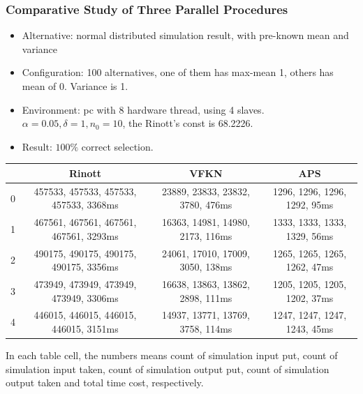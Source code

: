 \documentclass{beamer}
\begin{document}
\begin{frame}
\frametitle{Comparative Study of Three Parallel Procedures}
\begin{itemize}
\item {Alternative: } normal distributed simulation result, with pre-known mean and variance
\item {Configuration: } 100 alternatives, one of them has max-mean 1, others has mean of 0. Variance is 1.
\item {Environment: } pc with 8 hardware thread, using 4 slaves. $\alpha=0.05, \delta=1, n_0 = 10$, the Rinott's const is 68.2226.
\item {Result: } $100\%$ correct selection.
\end{itemize}
\begin{table}[ht]
\begin{center}
\scalebox{0.6}
{
\begin{tabular}{|c|c|c|c|}
\hline
& Rinott & VFKN & APS \\
\hline
0 & 457533, 457533, 457533, 457533, 3368ms & 23889, 23833, 23832, 3780, 476ms & 1296, 1296, 1296, 1292, 95ms \\
\hline
1 & 467561, 467561, 467561, 467561, 3293ms & 16363, 14981, 14980, 2173, 116ms & 1333, 1333, 1333, 1329, 56ms \\
\hline
2 & 490175, 490175, 490175, 490175, 3356ms & 24061, 17010, 17009, 3050, 138ms & 1265, 1265, 1265, 1262, 47ms \\
\hline
3 & 473949, 473949, 473949, 473949, 3306ms & 16638, 13863, 13862, 2898, 111ms & 1205, 1205, 1205, 1202, 37ms \\
\hline
4 & 446015, 446015, 446015, 446015, 3151ms & 14937, 13771, 13769, 3758, 114ms & 1247, 1247, 1247, 1243, 45ms \\
\hline
\end{tabular}
}
\end{center}
\end{table}
\tiny{In each table cell, the numbers means count of simulation input put, count of simulation input taken, count of simulation output put, count of simulation output taken and total time cost, respectively.}
\end{frame}
\end{document}
